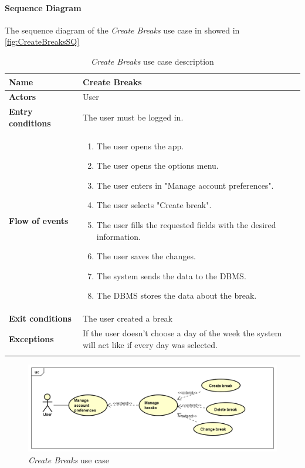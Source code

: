 \paragraph*{Sequence Diagram\\}
The sequence diagram of the \emph{Create Breaks} use case in showed in \autoref{fig:CreateBreaksSQ}
\newpage
\begin{longtable}{p{0.25\linewidth}|p{0.75\linewidth}}
	\hline
		\label{tab:CreateBreaksTAB}
	\textbf{Name} & \textbf{Create Breaks} \\
	\hline
	\textbf{Actors} & User \\
	\hline
	\textbf{Entry conditions} & The user must be logged in.\\
	\hline
	\textbf{Flow of events} & 
	\begin{enumerate}
		\item The user opens the app.
		\item The user opens the options menu.
		\item The user enters in "Manage account preferences".
		\item The user selects "Create break".
		\item The user fills the requested fields with the desired information.
		\item The user saves the changes.
		\item The system sends the data to the DBMS.
		\item The DBMS stores the data about the break.
	\end{enumerate}\\
	\hline
	\textbf{Exit conditions} & The user created a break\\
	\hline
	\textbf{Exceptions} & If the user doesn't choose a day of the week the system will act like if every day was selected. \\
	\hline
	\caption{\emph{Create Breaks} use case description}
\end{longtable}

\begin{figure}[h]
	\includegraphics[width=\textwidth]{Img/ManageBreaksUC}
	\caption{\emph{Create Breaks} use case}
	\label{fig:ManageBreaksUC}
\end{figure}

